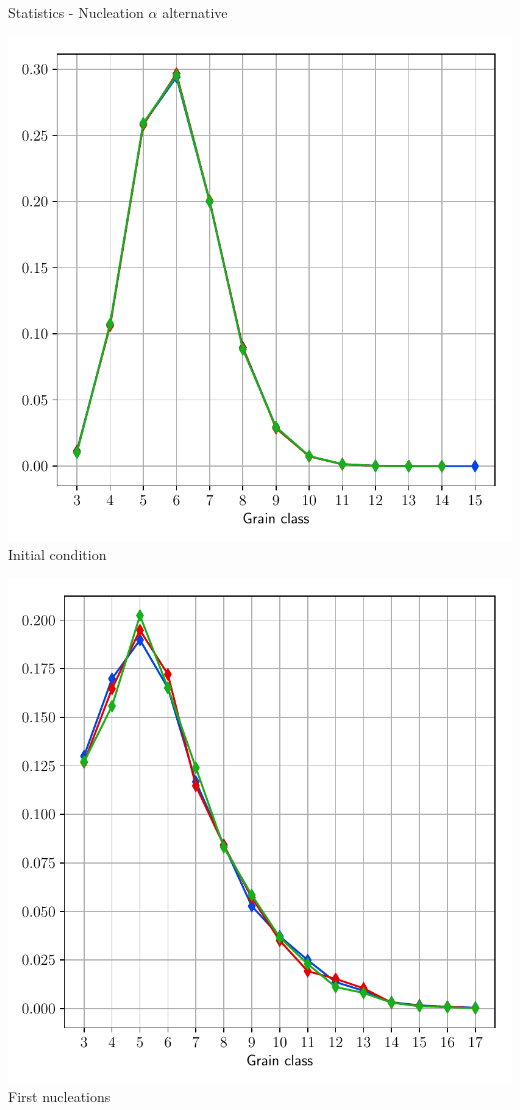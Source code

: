 \documentclass[usenames,dvipsnames]{beamer}
\begin{document}
\begin{frame}{Statistics - Nucleation $\alpha$ alternative}
\small
    \begin{minipage}{0.5\textwidth}
    \centering
    \includegraphics[scale=0.35]{figures/stored_energy/SE/nsides/000000_nuclalternative_set.pdf}\\
    Initial condition
    \end{minipage}%
    \begin{minipage}{0.5\textwidth}
    \centering
    \includegraphics[scale=0.35]{figures/stored_energy/SE/nsides/000070_nuclalternative_set.pdf}\\
    First nucleations
    \end{minipage}
\end{frame}
\end{document}
